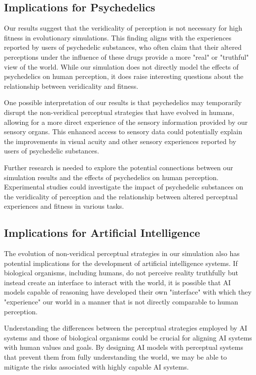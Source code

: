 \documentclass{article}[10pt]
\begin{document}
\subsection{Implications for Psychedelics}

Our results suggest that the veridicality of perception is not necessary for high fitness in evolutionary simulations. This finding aligns with the experiences reported by users of psychedelic substances, who often claim that their altered perceptions under the influence of these drugs provide a more "real" or "truthful" view of the world. While our simulation does not directly model the effects of psychedelics on human perception, it does raise interesting questions about the relationship between veridicality and fitness.

One possible interpretation of our results is that psychedelics may temporarily disrupt the non-veridical perceptual strategies that have evolved in humans, allowing for a more direct experience of the sensory information provided by our sensory organs. This enhanced access to sensory data could potentially explain the improvements in visual acuity and other sensory experiences reported by users of psychedelic substances.

Further research is needed to explore the potential connections between our simulation results and the effects of psychedelics on human perception. Experimental studies could investigate the impact of psychedelic substances on the veridicality of perception and the relationship between altered perceptual experiences and fitness in various tasks.

\subsection{Implications for Artificial Intelligence}

The evolution of non-veridical perceptual strategies in our simulation also has potential implications for the development of artificial intelligence systems. If biological organisms, including humans, do not perceive reality truthfully but instead create an interface to interact with the world, it is possible that AI models capable of reasoning have developed their own "interface" with which they "experience" our world in a manner that is not directly comparable to human perception.

Understanding the differences between the perceptual strategies employed by AI systems and those of biological organisms could be crucial for aligning AI systems with human values and goals. By designing AI models with perceptual systems that prevent them from fully understanding the world, we may be able to mitigate the risks associated with highly capable AI systems.
\end{document}
